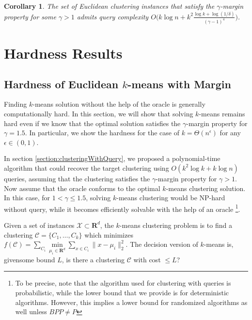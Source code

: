 \documentclass{article}
\newcommand{\mc}{\mathcal}
\newcommand{\mb}{\mathbf}
\newtheorem{corollary}[theorem]{Corollary}
\begin{document}
\begin{corollary}
The set of Euclidean clustering instances that satisfy the $\gamma$-margin property for some $\gamma > 1$ admits query complexity $O\big(k\log n + k^2\frac{\log k + \log (1/\delta)}{(\gamma - 1)^4}\big)$. 
\end{corollary}

\section{Hardness Results}
\label{section:lowerBounds}

\subsection{Hardness of Euclidean $k$-means with Margin}

Finding $k$-means solution without the help of the oracle is generally computationally hard. In this section, we will show that solving $k$-means remains hard even if we know that the optimal solution satisfies the $\gamma$-margin property for $\gamma=1.5$. In particular, we show the hardness for the case of $k=\Theta(n^\epsilon)$ for any $\epsilon\in (0,1)$. 

In section \ref{section:clusteringWithQuery}, we proposed a polynomial-time algorithm that could recover the target clustering using $O(k^2\log k +k\log n)$ queries, assuming that the clustering satisfies the $\gamma$-margin property for $\gamma>1$. Now assume that the oracle conforms to the optimal $k$-means clustering solution. In this case, for $1<\gamma\le 1.5$, solving $k$-means clustering would be NP-hard without query, while it becomes efficiently solvable with the help of an oracle \footnote{To be precise, note that the algorithm used for clustering with queries is probabilistic, while the lower bound that we provide is for deterministic algorithms. However, this implies a lower bound for randomized algorithms as well unless $BPP\neq P$}. 

Given a set of instances $\mc X \subset \mb R ^d$, the $k$-means clustering problem is to find a clustering $\mc C = \{C_1, \ldots, C_k\}$ which minimizes $f(\mc C) = \sum\limits_{C_i} \min\limits_{\mu_i\in {\mb R}^d}\sum\limits_{x\in C_i} \|x - \mu_i \|_2^2$. The decision version of $k$-means is, givensome bound $L$, is there a clustering $\mc C$ with cost $\le L$?
\end{document}
